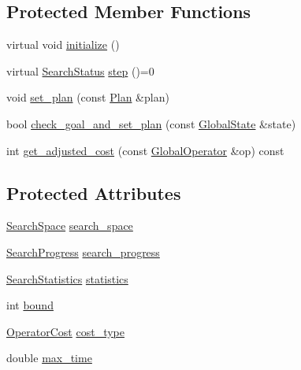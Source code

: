 \subsection*{Protected Member Functions}
\begin{DoxyCompactItemize}
\item 
virtual void \hyperlink{classSearchEngine_a72ae04f864fc906a5caa1d17bbbd3e95}{initialize} ()
\item 
virtual \hyperlink{search__engine_8h_a366b21ffe1b22f34ec2fa8f101b979f3}{Search\-Status} \hyperlink{classSearchEngine_a2c003ac4636fd1442fd2d4eb8db5ab8d}{step} ()=0
\item 
void \hyperlink{classSearchEngine_aa45b79c8fca7258b59f30545525dcdb5}{set\-\_\-plan} (const \hyperlink{classSearchEngine_a847191ccfee2c9e52d94aac85e144e2a}{Plan} \&plan)
\item 
bool \hyperlink{classSearchEngine_a4df85a6125380a052341794a4540c902}{check\-\_\-goal\-\_\-and\-\_\-set\-\_\-plan} (const \hyperlink{classGlobalState}{Global\-State} \&state)
\item 
int \hyperlink{classSearchEngine_aaa3c4e315c3d7d5e7a63107f8a03ffa0}{get\-\_\-adjusted\-\_\-cost} (const \hyperlink{classGlobalOperator}{Global\-Operator} \&op) const 
\end{DoxyCompactItemize}
\subsection*{Protected Attributes}
\begin{DoxyCompactItemize}
\item 
\hyperlink{classSearchSpace}{Search\-Space} \hyperlink{classSearchEngine_a25da0eadad8b694e645738f096c1afc4}{search\-\_\-space}
\item 
\hyperlink{classSearchProgress}{Search\-Progress} \hyperlink{classSearchEngine_a639a53ef1ca2db26c936ca62dbdf5e81}{search\-\_\-progress}
\item 
\hyperlink{classSearchStatistics}{Search\-Statistics} \hyperlink{classSearchEngine_a904954dd91947b71a737215b8b5ea9e8}{statistics}
\item 
int \hyperlink{classSearchEngine_a67a7d8e3d9b5682bda68d742badf5647}{bound}
\item 
\hyperlink{operator__cost_8h_aea97a5a2fbe3b57faf505007e38f5de9}{Operator\-Cost} \hyperlink{classSearchEngine_a598e111e16f596260c9fd566b11275f5}{cost\-\_\-type}
\item 
double \hyperlink{classSearchEngine_ab86002dc0b5e0d25cf58587b7a03e185}{max\-\_\-time}
\end{DoxyCompactItemize}


